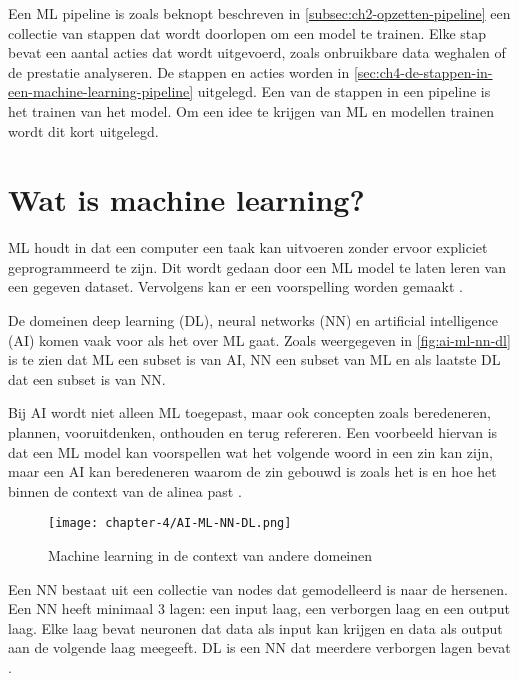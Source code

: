 
Een ML pipeline is zoals beknopt beschreven in \autoref{subsec:ch2-opzetten-pipeline} een collectie van stappen dat wordt doorlopen om een model te trainen. Elke stap bevat een aantal acties dat wordt uitgevoerd, zoals onbruikbare data weghalen of de prestatie analyseren. De stappen en acties worden in \autoref{sec:ch4-de-stappen-in-een-machine-learning-pipeline} uitgelegd. Een van de stappen in een pipeline is het trainen van het model. Om een idee te krijgen van ML en modellen trainen wordt dit kort uitgelegd.

\section{Wat is machine learning?}\label{sec:ch4-wat-is-machine-learning}
ML houdt in dat een computer een taak kan uitvoeren zonder ervoor expliciet geprogrammeerd te zijn. Dit wordt gedaan door een ML model te laten leren van een gegeven dataset. Vervolgens kan er een voorspelling worden gemaakt \cite[p.~1-3]{introduction-to-machine-learning}.

De domeinen deep learning (DL), neural networks (NN) en artificial intelligence (AI) komen vaak voor als het over ML gaat. Zoals weergegeven in \autoref{fig:ai-ml-nn-dl} is te zien dat ML een subset is van AI, NN een subset van ML en als laatste DL dat een subset is van NN.

Bij AI wordt niet alleen ML toegepast, maar ook concepten zoals beredeneren, plannen, vooruitdenken, onthouden en terug refereren. Een voorbeeld hiervan is dat een ML model kan voorspellen wat het volgende woord in een zin kan zijn, maar een AI kan beredeneren waarom de zin gebouwd is zoals het is en hoe het binnen de context van de alinea past \cite{ml-think-about-ml-brownlee}.

\begin{figure}[hbt!]
  \centering
  \texttt{[image: chapter-4/AI-ML-NN-DL.png]}
  \caption{Machine learning in de context van andere domeinen}
  \label{fig:ai-ml-nn-dl}
\end{figure}

Een NN bestaat uit een collectie van nodes dat gemodelleerd is naar de hersenen. Een NN heeft minimaal 3 lagen: een input laag, een verborgen laag en een output laag. Elke laag bevat neuronen dat data als input kan krijgen en data als output aan de volgende laag meegeeft. DL is een NN dat meerdere verborgen lagen bevat \cite{ml-neural-network-nicholson}.

